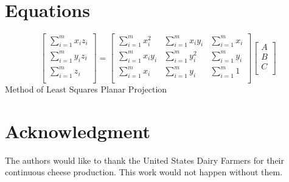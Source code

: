 \documentclass[journal,onecolumn]{IEEEtran}
\begin{document}
\appendices
\section{Equations}

\begin{equation}\label{eqn:MLS}
	\left[ {\begin{array}{cc}
			\sum_{i=1}^{m} x_i z_i \\
			\sum_{i=1}^{m} y_i z_i \\
			\sum_{i=1}^{m} z_i \\
			
	\end{array} } \right]
	=
	\left[ {\begin{array}{ccc}
			\sum_{i=1}^{m} x_i^2 		& \sum_{i=1}^{m} x_i y_i 		& \sum_{i=1}^{m} x_i \\
			\sum_{i=1}^{m} x_i y_i 		& \sum_{i=1}^{m} y_i^2 			& \sum_{i=1}^{m} y_i \\
			\sum_{i=1}^{m} x_i 			& \sum_{i=1}^{m} y_i 			& \sum_{i=1}^{m} 1   \\
	\end{array} } \right]
	\left[ {\begin{array}{cc}
			A\\
			B\\
			C\\
	\end{array} } \right]
\end{equation}
\centering
{Method of Least Squares Planar Projection}





\justifying
\section*{Acknowledgment}


	{The authors would like to thank the United States Dairy Farmers for their continuous cheese production. This work would not happen without them.}


\ifCLASSOPTIONcaptionsoff
\newpage
\fi
\end{document}
